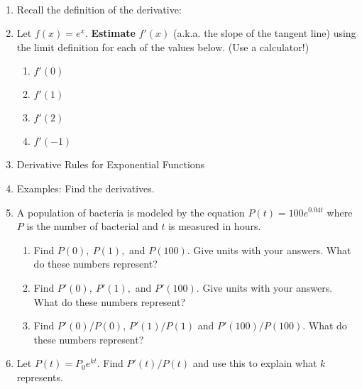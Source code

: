 \documentclass[11pt,fleqn]{article}
\begin{document}
\renewcommand{\headrulewidth}{0pt}
\newcommand{\blank}[1]{\rule{#1}{0.75pt}}
\newcommand{\bc}{\begin{center}}
\newcommand{\ec}{\end{center}}
\renewcommand{\d}{\displaystyle}

\vspace*{-0.7in}

\begin{center}
  \large
  \\
\end{center}
\begin{enumerate}
\item Recall the definition of the derivative:\\
\vspace{1in}
\item Let $f(x)=e^x.$ \textbf{Estimate} $f'(x)$ (a.k.a. the slope of the tangent line) using the limit definition for each of the values below. (Use a calculator!)
\begin{enumerate}
	\item $f'(0)$
	\vfill
	\item $f'(1)$
	\vfill
	\item $f'(2)$
	\vfill
	\item $f'(-1)$
	\vfill
\end{enumerate}
\item Derivative Rules for Exponential Functions	
\vspace{1.5in}
\newpage
\item Examples: Find the derivatives.

	\begin{enumerate}
	\begin{multicols}{2}
	\item $y=x^4e^x$
	\vfill
	\item $y=e^{x^2}$
	\vfill
	\end{multicols}
	\vfill
	\begin{multicols}{2}
	\item $y=5^{-x}$
	\vfill
	\item $f(x)=x^5+5^x$
	\vfill
	\end{multicols}
	\vfill
	\end{enumerate}

\item A population of bacteria is modeled by the equation $P(t)=100e^{0.04t}$ where $P$ is the number of bacterial and $t$ is measured in hours.
	\begin{enumerate}
	\item Find $P(0), \: P(1),$ and $P(100).$ Give units with your answers. What do these numbers represent?
	\vfill
	\item  Find $P'(0), \: P'(1),$ and $P'(100).$ Give units with your answers. What do these numbers represent?
	\vfill

	\item Find $P'(0)/P(0)$, $P'(1)/P(1)$ and $P'(100)/P(100).$ What do these numbers represent?	\vfill
	\end{enumerate}
\item Let $P(t)=P_0e^{kt}$. Find $P'(t)/P(t)$ and use this to explain what $k$ represents.
\vfill
\end{enumerate}
\end{document}
